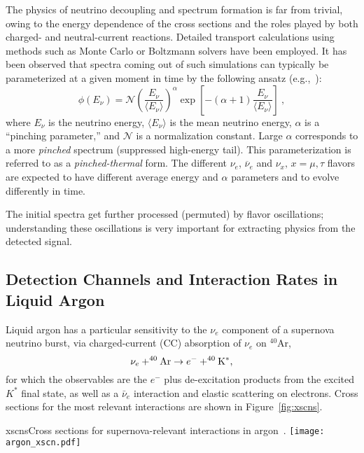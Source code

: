 The physics of neutrino decoupling and spectrum formation is far from trivial, owing to the energy dependence of the cross sections and the roles played by both charged- and neutral-current reactions.
Detailed transport calculations using methods such as Monte Carlo or Boltzmann solvers have been employed. It has been observed that spectra coming out of such simulations can typically be parameterized at a given moment in time by the following ansatz (e.g.,~\cite{Minakata:2008nc,Tamborra:2012ac}):
\begin{equation}
        \label{eq:pinched}
        \phi(E_{\nu}) = \mathcal{N} 
        \left(\frac{E_{\nu}}{\langle E_{\nu} \rangle}\right)^{\alpha} \exp\left[-\left(\alpha + 1\right)\frac{E_{\nu}}{\langle E_{\nu} \rangle}\right] \ ,
\end{equation}
where $E_{\nu}$ is the neutrino energy, $\langle E_\nu \rangle$ is the
mean neutrino energy, $\alpha$ is a ``pinching parameter,'' and
$\mathcal{N}$ is a normalization constant.
%
Large $\alpha$ corresponds to a more \emph{pinched} spectrum (suppressed
high-energy tail). This parameterization is referred to as a
\emph{pinched-thermal} form. The different $\nu_e$, $\overline{\nu}_e$ and
$\nu_x, \, x = \mu, \tau$ flavors are expected to have different
average energy and $\alpha$ parameters and to evolve differently in
time. 

The initial spectra get further processed (permuted) by flavor oscillations; understanding these oscillations is very important for extracting physics from the detected signal.

\subsection{Detection Channels and Interaction Rates in Liquid Argon}

Liquid argon has a particular sensitivity to the $\nu_e$ component of a supernova neutrino burst, via charged-current (CC)
absorption of $\nu_e$ on $^{40}$Ar,
\begin{equation}
\nu_e + ^{40}{\rm Ar} \rightarrow e^- + ^{40}{\rm K^*},
\label{eq:nueabs}
\end{equation}
for which the observables are the $e^-$ plus de-excitation products from the excited $K^*$ final state, as well as a $\bar{\nu}_e$ interaction and elastic scattering on electrons.
Cross sections for the most
relevant interactions are shown in Figure~\ref{fig:xscns}.

\begin{cdrfigure}{xscns}{Cross sections for supernova-relevant interactions in argon~\cite{GilBotella:2003sz,snowglobes}.}
\texttt{[image: argon\_xscn.pdf]}
\end{cdrfigure}

